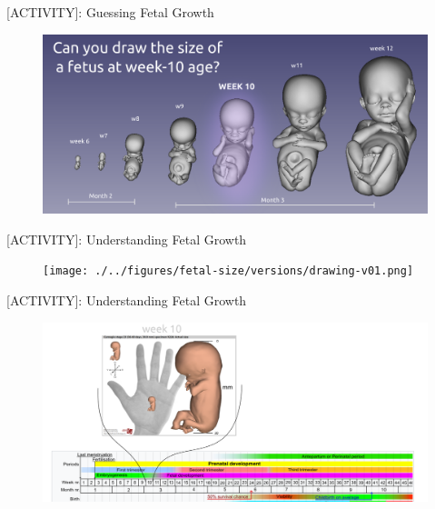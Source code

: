 {
\begin{frame}{[\faUsers ACTIVITY]: Guessing Fetal Growth}
      \begin{figure}
        \centering
        \includegraphics[width=1.0\textwidth]{./../figures/fetal-growth-guess/versions/drawing-v03}
      \end{figure}
\end{frame}
}



{
\begin{frame}{[\faUsers ACTIVITY]: Understanding Fetal Growth}
      \begin{figure}
        \centering
        \texttt{[image: ./../figures/fetal-size/versions/drawing-v01.png]}
      \end{figure}
\end{frame}
}


{
\begin{frame}{[\faUsers ACTIVITY]: Understanding Fetal Growth}
      \begin{figure}
        \centering
        \includegraphics[width=1.0\textwidth]{./../figures/fetal-size/versions/drawing-v02.png}
      \end{figure}
\end{frame}
}



